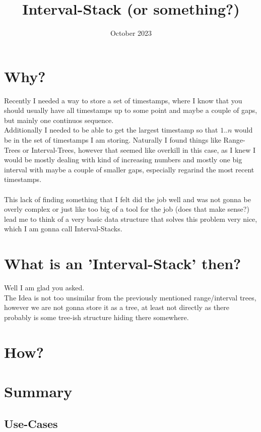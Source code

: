 \documentclass[a4paper, 11pt]{article}
\title{Interval-Stack (or something?)}
\date{October 2023}
\begin{document}
\section{Why?}
Recently I needed a way to store a set of timestamps, where I know that you should usually have all timestamps
up to some point and maybe a couple of gaps, but mainly one continuos sequence. \\
Additionally I needed to be able to get the largest timestamp so that $1..n$ would be in the set of timestamps
I am storing. Naturally I found things like Range-Trees or Interval-Trees, however that seemed like overkill in
this case, as I knew I would be mostly dealing with kind of increasing numbers and mostly one big interval with
maybe a couple of smaller gaps, especially regarind the most recent timestamps. \\
\\
This lack of finding something that I felt did the job well and was not gonna be overly complex or just like too
big of a tool for the job (does that make sense?) lead me to think of a very basic data structure that solves this
problem very nice, which I am gonna call Interval-Stacks.

\section{What is an 'Interval-Stack' then?}
Well I am glad you asked. \\
The Idea is not too unsimilar from the previously mentioned range/interval trees, however we are not gonna store
it as a tree, at least not directly as there probably is some tree-ish structure hiding there somewhere. \\


\section{How?}

\section{Summary}
\subsection{Use-Cases}
\end{document}
